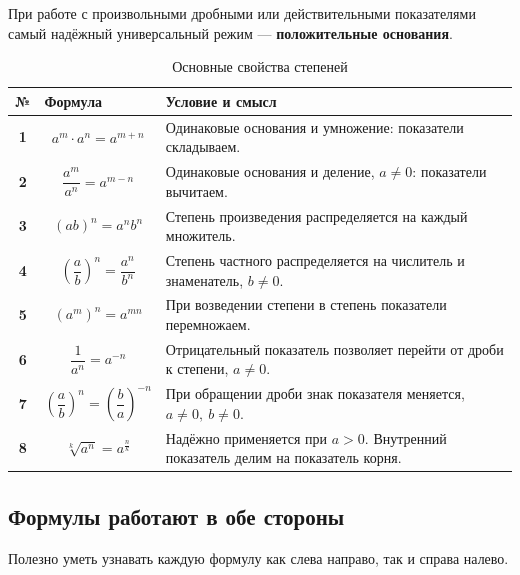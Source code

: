 \documentclass[a4paper,12pt]{article}
\newcommand{\important}[1]{\textbf{\color{darkaccent}#1}}
\begin{document}
При работе с произвольными дробными или действительными показателями
самый надёжный универсальный режим --- \important{положительные основания}.

\renewcommand{\arraystretch}{1.45}

\begin{table}[ht]
\centering
\caption{Основные свойства степеней}
\begin{tabularx}{\linewidth}{@{}>{\bfseries}c X X@{}}
\toprule
№ & Формула & Условие и смысл \\
\midrule

1 &
\[
a^m\cdot a^n=a^{m+n}
\]
&
Одинаковые основания и умножение:
показатели складываем.
\\

2 &
\[
\frac{a^m}{a^n}=a^{m-n}
\]
&
Одинаковые основания и деление,
\(a\ne0\):
показатели вычитаем.
\\

3 &
\[
(ab)^n=a^n b^n
\]
&
Степень произведения распределяется
на каждый множитель.
\\

4 &
\[
\left(\frac{a}{b}\right)^n
=
\frac{a^n}{b^n}
\]
&
Степень частного распределяется
на числитель и знаменатель,
\(b\ne0\).
\\

5 &
\[
(a^m)^n=a^{mn}
\]
&
При возведении степени в степень
показатели перемножаем.
\\

6 &
\[
\frac{1}{a^n}=a^{-n}
\]
&
Отрицательный показатель позволяет
перейти от дроби к степени,
\(a\ne0\).
\\

7 &
\[
\left(\frac{a}{b}\right)^n
=
\left(\frac{b}{a}\right)^{-n}
\]
&
При обращении дроби знак показателя
меняется,
\(a\ne0,\ b\ne0\).
\\

8 &
\[
\sqrt[k]{a^n}=a^{\frac nk}
\]
&
Надёжно применяется при \(a>0\).
Внутренний показатель делим
на показатель корня.
\\

\bottomrule
\end{tabularx}
\end{table}

\subsection*{\color{accent}Формулы работают в обе стороны}

Полезно уметь узнавать каждую формулу как слева направо,
так и справа налево.
\end{document}
